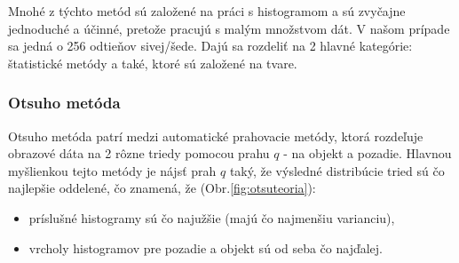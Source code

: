\documentclass[a4paper,11pt,oneside]{article}%
\begin{document}
Mnohé z týchto metód sú založené na  práci s histogramom a sú zvyčajne jednoduché a účinné, pretože pracujú s malým množstvom dát. V našom prípade sa jedná o 256 odtieňov sivej/šede. Dajú sa rozdeliť na 2 hlavné kategórie: štatistické metódy a také, ktoré sú založené na tvare.


\subsubsection{Otsuho metóda} \label{OtsuM}
Otsuho metóda\cite{otsu} patrí medzi automatické  prahovacie metódy, ktorá rozdeľuje obrazové dáta na 2 rôzne triedy pomocou prahu $q$ - na objekt a pozadie. Hlavnou myšlienkou tejto metódy je nájsť prah $q$ taký, že výsledné distribúcie tried sú čo najlepšie oddelené, čo znamená, že  (Obr.\ref{fig:otsuteoria}):
\begin{itemize}
\item príslušné histogramy sú čo najužšie (majú čo najmenšiu varianciu),
\item vrcholy histogramov pre pozadie a objekt sú od seba čo najďalej.
\end{itemize}
\end{document}
